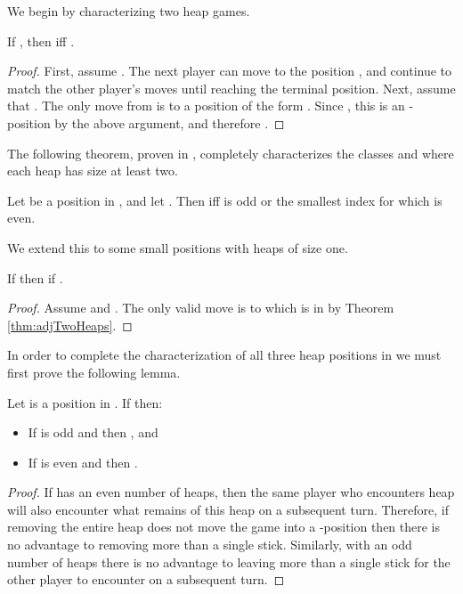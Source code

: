 \documentclass[letter,10pt]{article}
\begin{document}
We begin by characterizing two heap games.

\begin{theorem}\label{thm:adjTwoHeaps}
If , then  iff .
\end{theorem}
\begin{proof}
First, assume . The next player can move to the position , and continue to match the other player's moves until reaching the terminal position. Next, assume that . The only move from  is to a position of the form . Since , this is an -position by the above argument, and therefore .
\end{proof}


The following theorem, proven in \cite{DBLP:journals/tcs/DucheneR14}, completely characterizes the classes  and  where each heap has size at least two.

\begin{theorem}\label{thm:adjNim}
Let  be a position in , and let . Then  iff  is odd or the smallest index  for which  is even.
\end{theorem}

We extend this to some small positions with heaps of size one. 

\begin{theorem}\label{thm:adjThreeHeaps1}
If  then  if .
\end{theorem}
\begin{proof}
Assume  and . The only valid move is to  which is in  by Theorem \ref{thm:adjTwoHeaps}. 
\end{proof}

In order to complete the characterization of all three heap positions in  we must first prove the following lemma.

\begin{lemma}\label{lem:adjStrategy}
Let  is a position in . If  then:
\begin{itemize}
	\item If  is odd and  then , and 
	\item If  is even and  then .
\end{itemize}
\end{lemma}
\begin{proof}
If  has an even number of heaps, then the same player who encounters heap  will also encounter what remains of this heap on a subsequent turn. Therefore, if removing the entire heap does not move the game into a -position then there is no advantage to removing more than a single stick. Similarly, with an odd number of heaps there is no advantage to leaving more than a single stick for the other player to encounter on a subsequent turn.
\end{proof}
\end{document}
